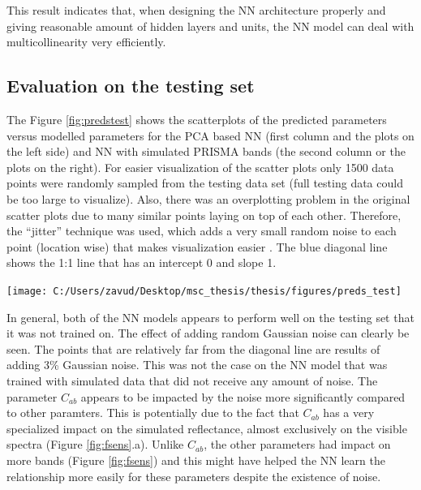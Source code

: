 \documentclass[a4paper, twoside]{templates/ociamthesis}
\let\origfigure\figure
\let\endorigfigure\endfigure
\renewenvironment{figure}[1][2] {
    \expandafter\origfigure\expandafter[H]
} {
    \endorigfigure
}
\begin{document}
This result indicates that, when designing the NN architecture properly and giving reasonable amount of hidden layers and units, the NN model can deal with multicollinearity very efficiently.

\hypertarget{evaluation-on-the-testing-set}{%
\subsection{Evaluation on the testing set}\label{evaluation-on-the-testing-set}}

The Figure \ref{fig:predstest} shows the scatterplots of the predicted parameters versus modelled parameters for the PCA based NN (first column and the plots on the left side) and NN with simulated PRISMA bands (the second column or the plots on the right). For easier visualization of the scatter plots only 1500 data points were randomly sampled from the testing data set (full testing data could be too large to visualize). Also, there was an overplotting problem in the original scatter plots due to many similar points laying on top of each other. Therefore, the ``jitter'' technique was used, which adds a very small random noise to each point (location wise) that makes visualization easier \citep{wickham2016r, ggplot2}. The blue diagonal line shows the 1:1 line that has an intercept 0 and slope 1.

\newpage

\begin{figure}
\texttt{[image: C:/Users/zavud/Desktop/msc\_thesis/thesis/figures/preds\_test]} \caption{Predicted versus modelled RTM parameters for the PCA based NN (1st column) and NN with simulated PRISMA bands (2nd column)}\label{fig:predstest}
\end{figure}

In general, both of the NN models appears to perform well on the testing set that it was not trained on. The effect of adding random Gaussian noise can clearly be seen. The points that are relatively far from the diagonal line are results of adding 3\% Gaussian noise. This was not the case on the NN model that was trained with simulated data that did not receive any amount of noise. The parameter \(C_{ab}\) appears to be impacted by the noise more significantly compared to other paramters. This is potentially due to the fact that \(C_{ab}\) has a very specialized impact on the simulated reflectance, almost exclusively on the visible spectra (Figure \ref{fig:fsens}.a). Unlike \(C_{ab}\), the other parameters had impact on more bands (Figure \ref{fig:fsens}) and this might have helped the NN learn the relationship more easily for these parameters despite the existence of noise.
\end{document}
